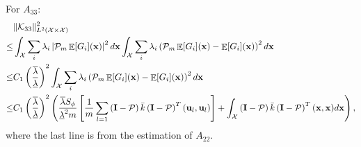 \documentclass[aos,preprint]{imsart}
\theoremstyle{plain}
\DeclareMathOperator{\E}{\mathbb E}
\newcommand{\CalX}{\mathcal X}
\newcommand{\CalP}{\mathcal P}
\newcommand{\CalK}{\mathcal K}
\newcommand{\Bx}{\bold x}
\newcommand{\BFx}{\bold x}
\newcommand{\Bu}{\bold u}
\theoremstyle{remark}
\begin{document}
\begin{appendix}
For $A_{33}$:
\begin{align*}
     &\|\CalK_{33}\|^2_{L^2(\CalX\times\CalX)}\\ 
     \leq &    \int_\CalX\sum_i\lambda_i\left|\CalP_m\E[G_i](\Bx)\right|^2d\Bx \int_\CalX\sum_i\lambda_i\left(\CalP_m\E[G_i](\Bx)-\E[G_i](\Bx)\right)^2d\Bx  \\
     \leq &  C_1\left(\frac{\overline{\lambda}}{\underline{\lambda}}\right)^2 \int_\CalX\sum_i\lambda_i\left(\CalP_m\E[G_i](\Bx)-\E[G_i](\Bx)\right)^2d\Bx  \\
     \leq & C_1 \left(\frac{\overline{\lambda}}{\underline{\lambda}}\right)^2 \left(\frac{\overline{\lambda}S_\phi}{\underline{\lambda}^2m}\left[\frac{1}{m}\sum_{l=1}\left(\bold{I}-\CalP\right)\bar{k}\left(\bold{I}-\CalP\right)^T(\Bu_l,\Bu_l)\right]+\int_\CalX\left(\bold{I}-\CalP\right)\bar{k}\left(\bold{I}-\CalP\right)^T(\BFx,\BFx)d\Bx\right),
\end{align*}
where the last line is from the estimation of $A_{22}$.


\end{appendix}
\end{document}
